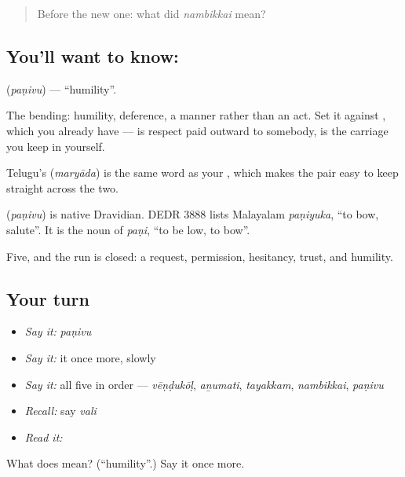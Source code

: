 \label{lesson:TA-C63-humility}



\begin{quote}
Before the new one: what did \emph{nambikkai} mean?
\end{quote}

\subsection*{You'll want to know: }
\textbf{} (\emph{paṇivu}) — \textquotedblleft{}humility\textquotedblright{}.

The bending: humility, deference, a manner rather than an act. Set it against , which you already have —  is respect paid outward to somebody,  is the carriage you keep in yourself.

Telugu's  (\emph{maryāda}) is the same word as your , which makes the pair easy to keep straight across the two.

\begin{cousinweb}
\textbf{} (\emph{paṇivu}) is native Dravidian. DEDR 3888 lists Malayalam \emph{paṇiyuka}, \textquotedblleft{}to bow, salute\textquotedblright{}. It is the noun of \emph{paṇi}, \textquotedblleft{}to be low, to bow\textquotedblright{}.
\end{cousinweb}

\begin{grammarlens}[title={What you've built}]
Five, and the run is closed: a request, permission, hesitancy, trust, and humility.
\end{grammarlens}

\subsection*{Your turn}
\begin{itemize}
\raggedright
  \item \emph{Say it:} \emph{paṇivu}
  \item \emph{Say it:} it once more, slowly
  \item \emph{Say it:} all five in order — \emph{vēṇḍukōḷ}, \emph{aṉumati}, \emph{tayakkam}, \emph{nambikkai}, \emph{paṇivu}
  \item \emph{Recall:} say \emph{vali}
  \item \emph{Read it:} \textbf{}
\end{itemize}

\begin{tcolorbox}[breakable,colback=teal!4,colframe=teal!35!black,title={Before you move on}]
What does  mean? (\textquotedblleft{}humility\textquotedblright{}.) Say it once more.
\end{tcolorbox}
